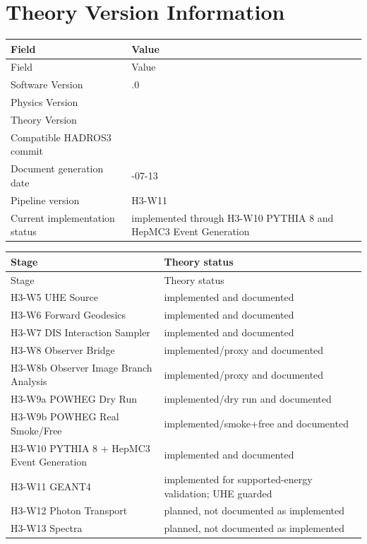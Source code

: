 \documentclass[11pt,a4paper]{report}
\numberwithin{equation}{chapter}
\newcommand{\SoftwareVersion}{0.9.0}
\newcommand{\PhysicsVersion}{1.3}
\newcommand{\TheoryVersion}{1.3}
\newcommand{\TheoryCompatibleCommit}{8395440}
\newcommand{\TheoryGenerationDate}{2026-07-13}
\newcommand{\TheoryPipelineVersion}{H3-W11}
\newcommand{\TheoryImplementationStatus}{implemented through H3-W10 PYTHIA 8 and HepMC3 Event Generation}
\begin{document}
\clearpage
\chapter*{Theory Version Information}

\begin{longtable}{>{\raggedright\arraybackslash}p{}
                  >{\raggedright\arraybackslash}p{}}
\toprule
Field & Value \\
\midrule
\endfirsthead
\toprule
Field & Value \\
\midrule
\endhead
Software Version & \SoftwareVersion \\
Physics Version & \PhysicsVersion \\
Theory Version & \TheoryVersion \\
Compatible HADROS3 commit & \TheoryCompatibleCommit \\
Document generation date & \TheoryGenerationDate \\
Pipeline version & \TheoryPipelineVersion \\
Current implementation status & \TheoryImplementationStatus \\
\bottomrule
\end{longtable}

\begin{longtable}{>{\raggedright\arraybackslash}p{}
                  >{\raggedright\arraybackslash}p{}}
\toprule
Stage & Theory status \\
\midrule
\endfirsthead
\toprule
Stage & Theory status \\
\midrule
\endhead
H3-W5 UHE Source & implemented and documented \\
H3-W6 Forward Geodesics & implemented and documented \\
H3-W7 DIS Interaction Sampler & implemented and documented \\
H3-W8 Observer Bridge & implemented/proxy and documented \\
H3-W8b Observer Image Branch Analysis & implemented/proxy and documented \\
H3-W9a POWHEG Dry Run & implemented/dry run and documented \\
H3-W9b POWHEG Real Smoke/Free & implemented/smoke+free and documented \\
H3-W10 PYTHIA 8 + HepMC3 Event Generation & implemented and documented \\
H3-W11 GEANT4 & implemented for supported-energy validation; UHE guarded \\
H3-W12 Photon Transport & planned, not documented as implemented \\
H3-W13 Spectra & planned, not documented as implemented \\
\bottomrule
\end{longtable}
\end{document}

